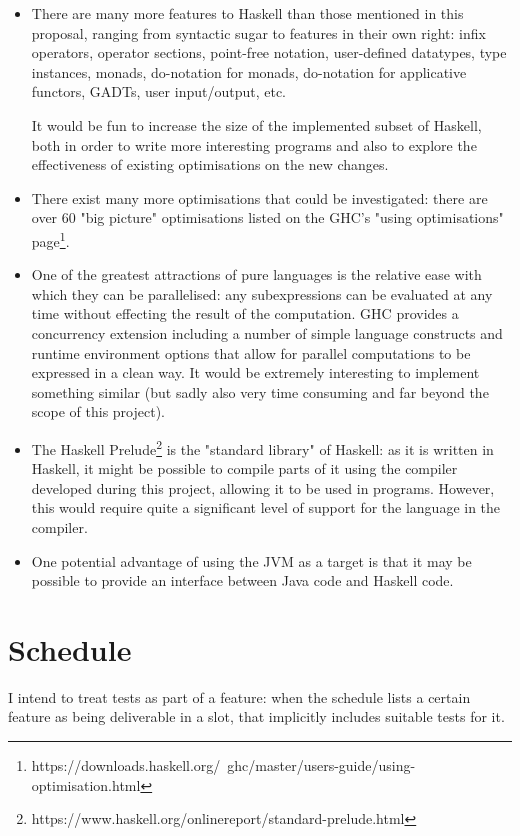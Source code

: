 \documentclass[12pt]{article}
\begin{document}
\begin{itemize}
\item
{
    There are many more features to Haskell than those mentioned in this proposal, ranging from syntactic sugar to
    features in their own right: infix operators, operator sections, point-free notation, user-defined datatypes, type
    instances, monads, do-notation for monads, do-notation for applicative functors, GADTs, user input/output, etc.

    It would be fun to increase the size of the implemented subset of Haskell, both in order to write more interesting
    programs and also to explore the effectiveness of existing optimisations on the new changes.
}
\item
{
    There exist many more optimisations that could be investigated: there are over 60 "big picture" optimisations listed
    on the GHC's "using optimisations" page\footnote{https://downloads.haskell.org/~ghc/master/users-guide/using-optimisation.html}.
}
\item
{
    One of the greatest attractions of pure languages is the relative ease with which they can be parallelised: any
    subexpressions can be evaluated at any time without effecting the result of the computation. GHC provides a
    concurrency extension including a number of simple language constructs and runtime environment options that allow
    for parallel computations to be expressed in a clean way. It would be extremely interesting to implement something
    similar (but sadly also very time consuming and far beyond the scope of this project).
}
\item
{
    The Haskell Prelude\footnote{https://www.haskell.org/onlinereport/standard-prelude.html} is the "standard library"
    of Haskell: as it is written in Haskell, it might be possible to compile parts of it using the compiler developed
    during this project, allowing it to be used in programs. However, this would require quite a significant level of
    support for the language in the compiler.
}
\item
{
    One potential advantage of using the JVM as a target is that it may be possible to provide an interface between Java
    code and Haskell code.
}
\end{itemize}

\section*{Schedule}

I intend to treat tests as part of a feature: when the schedule lists a certain feature as being deliverable in a slot,
that implicitly includes suitable tests for it.
\end{document}
